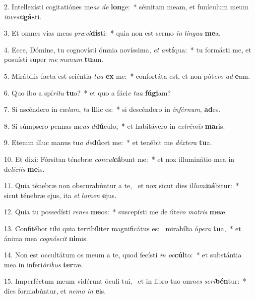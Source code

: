2. Intellexísti cogitatiónes me\textit{as} \textit{de} \textbf{lon}ge:~*  sémitam meam, et funículum meum \textit{in}\textit{ves}\textit{ti}\textbf{gás}ti.\

3. Et omnes vias meas \textit{præ}\textit{vi}\textbf{dís}ti:~*  quia non est sermo \textit{in} \textit{lin}\textit{gua} \textbf{me}a.\

4. Ecce, Dómine, tu cognovísti ómnia novíssima, \textit{et} \textit{an}\textbf{tí}qua:~*  tu formásti me, et posuísti super \textit{me} \textit{ma}\textit{num} \textbf{tu}am.\

5. Mirábilis facta est sciéntia \textit{tu}\textit{a} \textbf{ex} me:~*  confortáta est, et non pót\textit{e}\textit{ro} \textit{ad} \textbf{e}am.\

6. Quo ibo a spí\textit{ri}\textit{tu} \textbf{tu}o?~*  et quo a fáci\textit{e} \textit{tu}\textit{a} \textbf{fú}\textbf{gi}am?\

7. Si ascéndero in cæ\textit{lum}, \textit{tu} \textbf{il}lic es:~*  si descéndero in \textit{in}\textit{fér}\textit{num}, \textbf{ad}es.\

8. Si súmpsero pennas me\textit{as} \textit{di}\textbf{lú}culo,~*  et habitávero in \textit{ex}\textit{tré}\textit{mis} \textbf{ma}ris.\

9. Etenim illuc manus tu\textit{a} \textit{de}\textbf{dú}cet me:~*  et tenébit me \textit{déx}\textit{te}\textit{ra} \textbf{tu}a.\

10. Et dixi: Fórsitan ténebræ \textit{con}\textit{cul}\textbf{cá}bunt me:~*  et nox illuminátio mea in de\textit{lí}\textit{ci}\textit{is} \textbf{me}is.\

11. Quia ténebræ non obscurabúntur a te, \dag\  et nox sicut dies il\textit{lu}\textit{mi}\textbf{ná}bitur:~*  sicut ténebræ ejus, ita \textit{et} \textit{lu}\textit{men} \textbf{e}jus.\

12. Quia tu possedísti \textit{re}\textit{nes} \textbf{me}os:~*  suscepísti me de úte\textit{ro} \textit{ma}\textit{tris} \textbf{me}æ.\

13. Confitébor tibi quia terribíliter magnificátus es: \dag\  mirabília ó\textit{pe}\textit{ra} \textbf{tu}a,~*  et ánima mea \textit{co}\textit{gnó}\textit{scit} \textbf{ni}mis.\

14. Non est occultátum os meum a te, quod fecísti \textit{in} \textit{oc}\textbf{cúl}to:~*  et substántia mea in inferi\textit{ó}\textit{ri}\textit{bus} \textbf{ter}ræ.\

15. Imperféctum meum vidérunt óculi tui, \dag\  et in libro tuo om\textit{nes} \textit{scri}\textbf{bén}tur:~*  dies formabúntur, et \textit{ne}\textit{mo} \textit{in} \textbf{e}is.\


